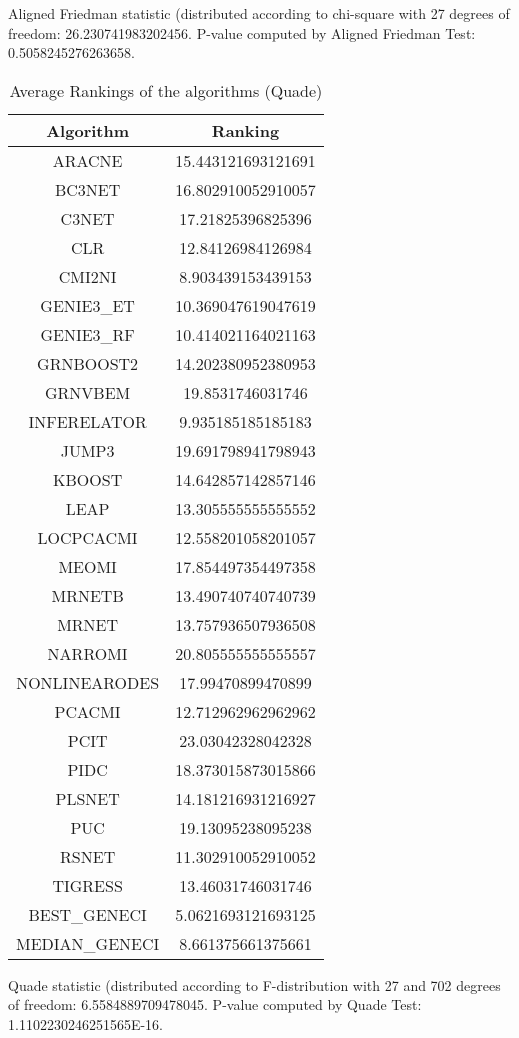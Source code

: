 \documentclass[a4paper,10pt]{article}
\begin{document}
\begin{landscape}
Aligned Friedman statistic (distributed according to chi-square with 27 degrees of freedom: 26.230741983202456. 
P-value computed by Aligned Friedman Test: 0.5058245276263658.\newline


\newpage

\begin{table}[!htp]
\centering
\caption{Average Rankings of the algorithms (Quade)
}\begin{tabular}{c|c}
Algorithm&Ranking\\
\hline
ARACNE&15.443121693121691\\
BC3NET&16.802910052910057\\
C3NET&17.21825396825396\\
CLR&12.84126984126984\\
CMI2NI&8.903439153439153\\
GENIE3_ET&10.369047619047619\\
GENIE3_RF&10.414021164021163\\
GRNBOOST2&14.202380952380953\\
GRNVBEM&19.8531746031746\\
INFERELATOR&9.935185185185183\\
JUMP3&19.691798941798943\\
KBOOST&14.642857142857146\\
LEAP&13.305555555555552\\
LOCPCACMI&12.558201058201057\\
MEOMI&17.854497354497358\\
MRNETB&13.490740740740739\\
MRNET&13.757936507936508\\
NARROMI&20.805555555555557\\
NONLINEARODES&17.99470899470899\\
PCACMI&12.712962962962962\\
PCIT&23.03042328042328\\
PIDC&18.373015873015866\\
PLSNET&14.181216931216927\\
PUC&19.13095238095238\\
RSNET&11.302910052910052\\
TIGRESS&13.46031746031746\\
BEST_GENECI&5.0621693121693125\\
MEDIAN_GENECI&8.661375661375661\\
\end{tabular}
\end{table}
Quade statistic (distributed according to F-distribution with 27 and 702 degrees of freedom: 6.5584889709478045. 
P-value computed by Quade Test: 1.1102230246251565E-16.\newline



\end{landscape}
\end{document}
